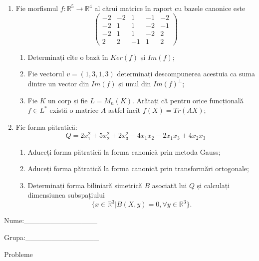 \documentclass{article}
\begin{document}
\begin{enumerate}
 \item Fie morfismul $f:\mathbb{R}^5 \to \mathbb{R}^4$ al cărui matrice în raport cu bazele canonice este
$$\begin{pmatrix}
-2&-2&1&-1&-2\\
-2&1&1&-2&-1\\
-2&1&1&-2&2\\
2&2&-1&1&2
\end{pmatrix}$$

\begin{enumerate}
\item Determinați cîte o bază în $Ker(f)$ și $Im(f)$;
\item Fie vectorul $v=(1,3,1,3)$ determinați descompunerea acestuia ca suma dintre un vector din $Im(f)$ și unul din $Im(f)^\perp$;
\item Fie $K$ un corp și fie $L=M_n(K)$. Arătați că pentru orice funcțională $f \in L^*$ există o matrice $A$ astfel încît $f(X)=Tr(AX)$;
\end{enumerate}
\item Fie forma pătratică:
$$Q= 2x_1^2+5x_2^2+2x_3^2-4x_1x_2-2x_1x_3+4x_2x_3$$

\begin{enumerate}
\item Aduceți forma pătratică la forma canonică prin metoda Gauss;
\item Aduceți forma pătratică la forma canonică prin transformări ortogonale;
\item Determinați forma biliniară simetrică $B$ asociată lui $Q$ și calculați dimensiunea subspațiului
$$\{x \in \mathbb{R}^3 | B(X,y)=0,\forall y \in \mathbb{R}^3\}.$$

\end{enumerate}
\end{enumerate}
\newpage
\begin{flushright}
Nume:\_\_\_\_\_\_\_\_\_\_\_\_\_\_
 
 
Grupa:\_\_\_\_\_\_\_\_\_\_\_\_\_\_
\end{flushright}
\begin{center}
\vspace{2cm}
{\Large Probleme}
\vspace{2cm}
\end{center}
\end{document}
